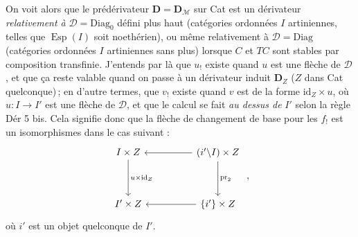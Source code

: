 \documentclass[11pt]{article}
\newcommand{\msp}[1]{\ifstrequal{#1}{page 1}{}{\marginpar{\footnotesize [#1]}}}
\newcommand{\M}{\mathcal{M}}
\newcommand{\Esp}{\operatorname{Esp}}
\newcommand{\id}{\mathrm{id}}
\newcommand{\pr}{\mathrm{pr}}
\begin{document}
On voit alors que le prédérivateur $\mathbf{D} = \mathbf{D}_{\M}$ sur Cat est un dérivateur \textit{relativement à} $\mathcal{D} = \mathrm{Diag}_0$ défini plus haut (catégories ordonnées $I$ artiniennes, telles que $\Esp(I)$ soit noethérien), ou même relativement à $\mathcal{D} = \mathrm{Diag}$ (catégories ordonnées $I$ artiniennes sans plus) lorsque $C$ et $TC$ sont stables par composition transfinie. J'entends par là que $u_!$ existe quand $u$ est une flèche de $\mathcal{D}$,
\msp{page 70}
et que ça reste valable quand on passe à un dérivateur induit $\mathbf{D}_Z$ ($Z$ dans Cat quelconque)\,; en d'autre termes, que $v_!$ existe quand $v$ est de la forme $\id_Z\times u$, où $u : I\longrightarrow I'$ est une %
flèche de $\mathcal{D}$, et que le calcul se fait \textit{au dessus de} $I'$ selon la règle Dér 5 bis. Cela signifie donc que la flèche de changement de base pour les $f_!$ est un isomorphismes dans le cas %
suivant :
\[
\begin{tikzcd}[row sep=huge, column sep=huge]
I\times Z \arrow[d, "u\times\id_Z"] & (i'\backslash I)\times Z \arrow[l] \arrow[d, "\pr_2"] \\
I'\times Z & \{i'\}\times Z \arrow[l]
\end{tikzcd}
\ ,
\]
où $i'$ est un objet quelconque de $I'$.
\end{document}
